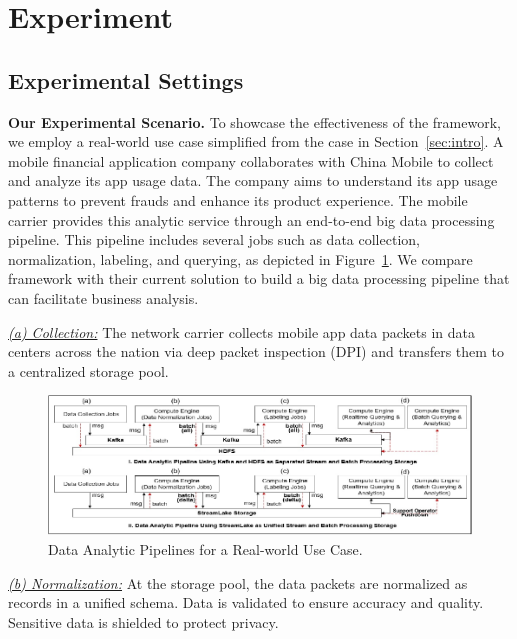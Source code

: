\section{Experiment} 
\label{sec:exp}

\subsection{Experimental Settings}


\noindent \textbf{Our Experimental Scenario.} To showcase the effectiveness of the \sys framework, we employ a real-world use case simplified from the case in Section~\ref{sec:intro}.   A mobile financial application company collaborates with China Mobile to collect and analyze its app usage data. The company aims to understand its app usage patterns to prevent frauds and enhance its product experience. The mobile carrier provides this analytic service through an end-to-end big data processing pipeline. This pipeline includes several jobs such as data collection, normalization, labeling, and querying, as depicted in Figure~\ref{exp:fig:case}.
We compare  \sys framework with their current solution to build a big data processing pipeline that can facilitate business analysis.

\noindent \underline{\textit{(a) Collection:}}  The network carrier collects mobile app data packets in  data centers across the nation via deep packet inspection (DPI) and transfers them to a centralized storage pool.


 \begin{figure}[htbp]
	\includegraphics[scale=0.95]{figures/case}
	\centering
	\vspace{-1em}
	\caption{Data Analytic Pipelines for a  Real-world Use Case.}
	\label{exp:fig:case}
	\vspace{-1em}
\end{figure}
\noindent \underline{\textit{(b) Normalization:}} At the  storage pool, the data packets are normalized as records in a unified schema. Data is validated to ensure accuracy and quality. Sensitive data is shielded to protect  privacy. 

